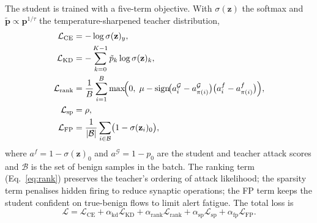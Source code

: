 The student is trained with a five-term objective. With
$\sigma(\mathbf{z})$ the softmax and
$\tilde{\mathbf{p}} \propto \mathbf{p}^{1/\tau}$ the temperature-sharpened
teacher distribution,
\begin{align}
\mathcal{L}_{\mathrm{CE}}   &= -\log \sigma(\mathbf{z})_{y}, \\
\mathcal{L}_{\mathrm{KD}}   &= -\sum_{k=0}^{K-1} \tilde{p}_{k}
                               \log \sigma(\mathbf{z})_{k}, \\
\mathcal{L}_{\mathrm{rank}} &= \frac{1}{B}\sum_{i=1}^{B}
      \max\!\Bigl(0,\; \mu - \operatorname{sign}\!\bigl(a^{\mathcal{G}}_{i}
      - a^{\mathcal{G}}_{\pi(i)}\bigr)\bigl(a^{f}_{i} - a^{f}_{\pi(i)}\bigr)\Bigr),
      \label{eq:rank}\\
\mathcal{L}_{\mathrm{sp}}   &= \rho, \\
\mathcal{L}_{\mathrm{FP}}   &= \frac{1}{|\mathcal{B}|}\sum_{i \in \mathcal{B}}
      \bigl(1 - \sigma(\mathbf{z}_{i})_{0}\bigr),
\end{align}
where $a^{f} = 1 - \sigma(\mathbf{z})_{0}$ and
$a^{\mathcal{G}} = 1 - p_{0}$ are the student and teacher attack scores and
$\mathcal{B}$ is the set of benign samples in the batch. The ranking term
(Eq.~\ref{eq:rank}) preserves the teacher's ordering of attack likelihood; the
sparsity term penalises hidden firing to reduce synaptic operations; the FP
term keeps the student confident on true-benign flows to limit alert fatigue.
The total loss is
\begin{equation}
\mathcal{L} = \mathcal{L}_{\mathrm{CE}}
  + \alpha_{\mathrm{kd}}   \mathcal{L}_{\mathrm{KD}}
  + \alpha_{\mathrm{rank}} \mathcal{L}_{\mathrm{rank}}
  + \alpha_{\mathrm{sp}}   \mathcal{L}_{\mathrm{sp}}
  + \alpha_{\mathrm{fp}}   \mathcal{L}_{\mathrm{FP}}.
\label{eq:total_loss}
\end{equation}

